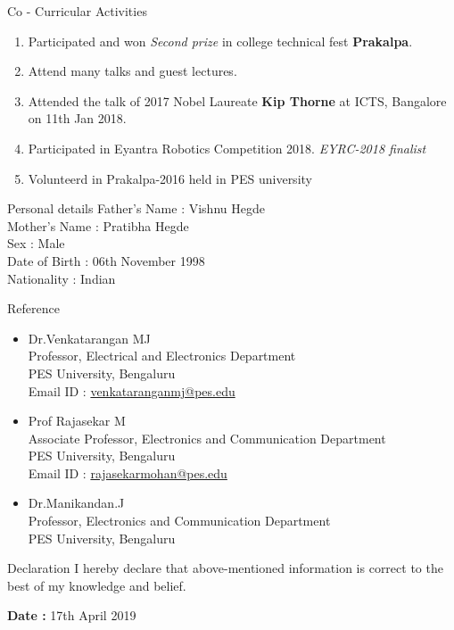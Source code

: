 \documentclass{resume} %
\begin{document}
\vspace{1cm}



\begin{rSection}{Co - Curricular Activities}
\begin{enumerate}
    \item Participated and won \textit{Second prize} in college technical fest {\bf Prakalpa}.
    \item Attend many talks and guest lectures.
    \item Attended the talk of 2017 Nobel Laureate {\bf Kip Thorne} at ICTS, Bangalore on 11th Jan 2018.
    \item Participated in Eyantra Robotics Competition 2018. \textit{EYRC-2018 finalist} 
    \item Volunteerd in Prakalpa-2016 held in PES university
\end{enumerate}
\end{rSection}





\begin{rSection}{Personal details}
Father's Name : Vishnu Hegde \\
Mother's Name : Pratibha Hegde \\
Sex : Male \\
Date of Birth : 06th November 1998 \\
Nationality : Indian \\

\end{rSection}






\begin{rSection}{Reference}
\begin{itemize}

	\item Dr.Venkatarangan MJ\\
		Professor, Electrical and Electronics Department\\
		PES University, Bengaluru\\
		Email ID : \href{http://13.232.26.175/p10106}{venkataranganmj@pes.edu} \\

	\item Prof Rajasekar M\\
		Associate Professor, Electronics and Communication Department\\
		PES University, Bengaluru\\
		Email ID :  \href{https://faculty.pes.edu/p10125}{rajasekarmohan@pes.edu} \\
		
	\item Dr.Manikandan.J\\
		Professor, Electronics and Communication Department\\
		PES University, Bengaluru\\
\end{itemize}
\end{rSection}


\begin{rSection}{Declaration}
I hereby declare that above-mentioned information is correct to the best of my knowledge and belief. \\
\end{rSection}

{\bf Date : } 17th April 2019
\end{document}
